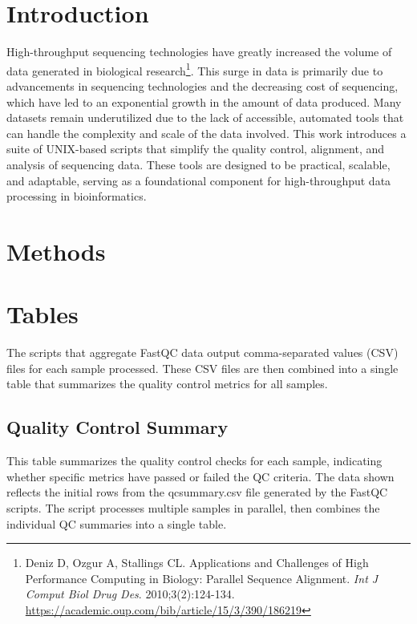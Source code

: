 \documentclass[unnumsec,webpdf,contemporary,large]{oup-authoring-template}%
\theoremstyle{thmstyleone}%
\theoremstyle{thmstyletwo}%
\theoremstyle{thmstylethree}%
\begin{document}

\section{Introduction}
High-throughput sequencing technologies have greatly increased the volume of data generated in biological research\footnote{Deniz D, Ozgur A, Stallings CL. Applications and Challenges of High Performance Computing in Biology: Parallel Sequence Alignment. \textit{Int J Comput Biol Drug Des}. 2010;3(2):124-134. \url{https://academic.oup.com/bib/article/15/3/390/186219}}. This surge in data is primarily due to advancements in sequencing technologies and the decreasing cost of sequencing, which have led to an exponential growth in the amount of data produced. Many datasets remain underutilized due to the lack of accessible, automated tools that can handle the complexity and scale of the data involved. This work introduces a suite of UNIX-based scripts that simplify the quality control, alignment, and analysis of sequencing data. These tools are designed to be practical, scalable, and adaptable, serving as a foundational component for high-throughput data processing in bioinformatics.

\section{Methods}

\section{Tables}

The scripts that aggregate FastQC data output comma-separated values (CSV) files for each sample processed. These CSV files are then combined into a single table that summarizes the quality control metrics for all samples.

\subsection{Quality Control Summary}

This table summarizes the quality control checks for each sample, indicating whether specific metrics have passed or failed the QC criteria. The data shown reflects the initial rows from the qcsummary.csv file generated by the FastQC scripts. The  script processes multiple samples in parallel, then combines the individual QC summaries into a single table.
\end{document}
